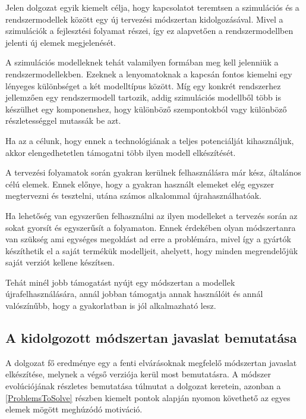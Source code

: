         \begin{req} \label{sec:SzimIntKov}
            Jelen dolgozat egyik kiemelt célja, hogy kapcsolatot teremtsen a szimulációs és a rendszermodellek között egy új tervezési módszertan kidolgozásával.
            Mivel a szimulációk a fejlesztési folyamat részei, így ez alapvetően a rendszermodellben jelenti új elemek megjelenését.
            
            A szimulációs modelleknek tehát valamilyen formában meg kell jelenniük a rendszermodellekben.
            Ezeknek a lenyomatoknak a kapcsán fontos kiemelni egy lényeges különbséget a két modelltípus között.
            Míg egy konkrét rendszerhez jellemzően egy rendszermodell tartozik, addig szimulációs modellből több is készülhet egy komponenshez, hogy különböző szempontokból vagy különböző részletességgel mutassák be azt.
            
            Ha az a célunk, hogy ennek a technológiának a teljes potenciálját kihasználjuk, akkor elengedhetetlen támogatni több ilyen modell elkészítését.
        \end{req}

        \begin{req} \label{sec:Ujrahasznalas}
            A tervezési folyamatok során gyakran kerülnek felhasználásra már kész, általános célú elemek.
            Ennek előnye, hogy a gyakran használt elemeket elég egyszer megtervezni és tesztelni, utána számos alkalommal újrahasználhatóak.
            
            Ha lehetőség van egyszerűen felhasználni az ilyen modelleket a tervezés során az sokat gyorsít és egyszerűsít a folyamaton.
            Ennek érdekében olyan módszertanra van szükség ami egységes megoldást ad erre a problémára, mivel így a gyártók készíthetik el a saját termékük modelljeit, ahelyett, hogy minden megrendelőjük saját verziót kellene készítsen.
            
            Tehát minél jobb támogatást nyújt egy módszertan a modellek újrafelhasználására, annál jobban támogatja annak használóit és annál valószínűbb, hogy a gyakorlatban is jól alkalmazható lesz.    
        \end{req}

    \subsection{A kidolgozott módszertan javaslat bemutatása}
    A dolgozat fő eredménye egy a fenti elvárásoknak megfelelő módszertan javaslat elkészítése, melynek a végső verziója kerül most bemutatásra. A módszer evolúciójának részletes bemutatása túlmutat a dolgozat keretein, azonban a \ref{ProblemsToSolve} részben kiemelt pontok alapján nyomon követhető az egyes elemek mögött meghúzódó motiváció.
        
